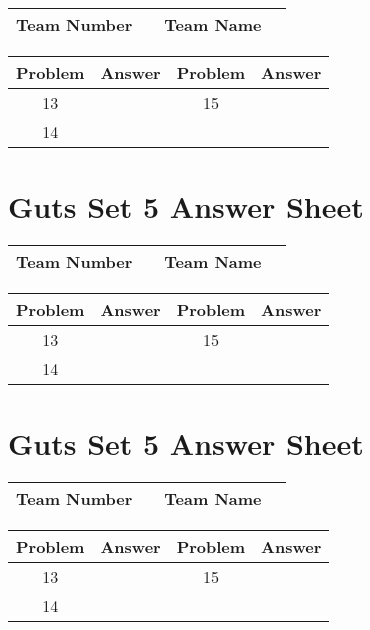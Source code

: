 \documentclass[14pt]{article}
\begin{document}
\begin{center}
\begin{tabular}{|r|r|r|r|}
\hline
	Team Number & \hspace{10em} &
	Team Name & \hspace{15em} \\ \hline
\end{tabular}
\end{center}
\begin{tabularx}{\textwidth}{|c|l|c|X|}\hline
	Problem & Answer & Problem & Answer \\\hline
	13 & \hspace{15em} & 15 & \\\hline
	14 & & & \\\hline
\end{tabularx}

\vspace{30px}

\section*{Guts Set 5 Answer Sheet}

\begin{center}
\begin{tabular}{|r|r|r|r|}
\hline
	Team Number & \hspace{10em} &
	Team Name & \hspace{15em} \\ \hline
\end{tabular}
\end{center}
\begin{tabularx}{\textwidth}{|c|l|c|X|}\hline
	Problem & Answer & Problem & Answer \\\hline
	13 & \hspace{15em} & 15 & \\\hline
	14 & & & \\\hline
\end{tabularx}

\vspace{30px}

\section*{Guts Set 5 Answer Sheet}

\begin{center}
\begin{tabular}{|r|r|r|r|}
\hline
	Team Number & \hspace{10em} &
	Team Name & \hspace{15em} \\ \hline
\end{tabular}
\end{center}
\begin{tabularx}{\textwidth}{|c|l|c|X|}\hline
	Problem & Answer & Problem & Answer \\\hline
	13 & \hspace{15em} & 15 & \\\hline
	14 & & & \\\hline
\end{tabularx}
\end{document}
